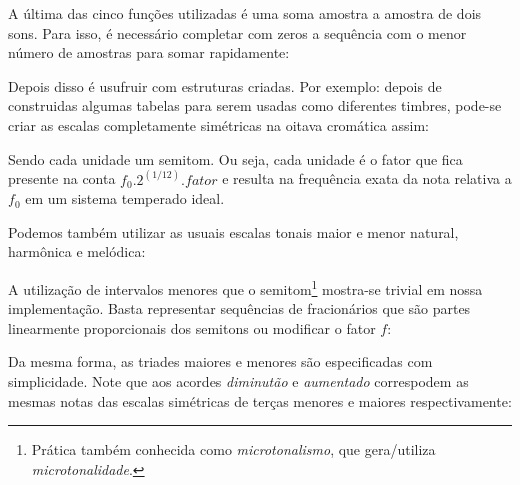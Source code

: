 
A última das cinco funções utilizadas é uma soma amostra a amostra de dois sons. Para isso,
é necessário completar com zeros a sequência com o menor número de amostras para somar rapidamente:


Depois disso é usufruir com estruturas criadas. Por exemplo: depois de construidas
algumas tabelas para serem usadas como diferentes timbres, pode-se criar as
escalas completamente simétricas na oitava cromática assim:


% 

Sendo cada unidade um semitom. Ou seja, cada unidade é o fator que fica presente na conta $f_0 . 2^{(1/12)} . fator $ e resulta na frequência exata da nota relativa a $f_0$ em um sistema temperado ideal.

Podemos também utilizar as usuais
escalas tonais maior e menor natural, harmônica e melódica:


A utilização de intervalos menores que o semitom\footnote{Prática também conhecida
como \emph{microtonalismo}, que gera/utiliza \emph{microtonalidade}.} mostra-se trivial em
nossa implementação. Basta representar sequências de fracionários
que são partes linearmente proporcionais dos semitons ou modificar o fator $f$:


Da mesma forma, as triades maiores e menores
são especificadas com simplicidade. Note que aos acordes \emph{diminutão} e
\emph{aumentado} correspodem as mesmas notas das escalas simétricas de terças menores
e maiores respectivamente:



